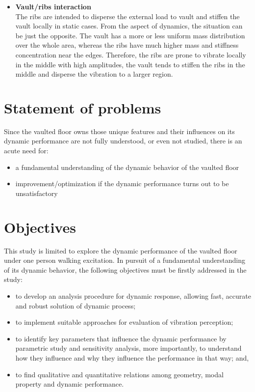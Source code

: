 \begin{itemize}
    \item \textbf{Vault/ribs interaction}\\
    The ribs are intended to disperse the external load to vault and stiffen the vault locally in static cases. From the aspect of dynamics, the situation can be just the opposite. The vault has a more or less uniform mass distribution over the whole area, whereas the ribs have much higher mass and stiffness concentration near the edges. Therefore, the ribs are prone to vibrate locally in the middle with high amplitudes, the vault tends to stiffen the ribs in the middle and disperse the vibration to a larger region.
    
\end{itemize}

\section{Statement of problems}
Since the vaulted floor owns those unique features and their influences on its dynamic performance are not fully understood, or even not studied, there is an acute need for:
\begin{itemize}
    \item a fundamental understanding of the dynamic behavior of the vaulted floor
    \item improvement/optimization if the dynamic performance turns out to be unsatisfactory
\end{itemize}

\section{Objectives}
This study is limited to explore the dynamic performance of the vaulted floor under one person walking excitation. In pursuit of a fundamental understanding of its dynamic behavior, the following objectives must be firstly addressed in the study:
\begin{itemize}
    \item to develop an analysis procedure for dynamic response, allowing fast, accurate and robust solution of dynamic process;
    \item to implement suitable approaches for evaluation of vibration perception;
    \item to identify key parameters that influence the dynamic performance by parametric study and sensitivity analysis, more importantly, to understand how they influence and why they influence the performance in that way; and,
    \item to find qualitative and quantitative relations among geometry, modal property and dynamic performance. 
\end{itemize}

